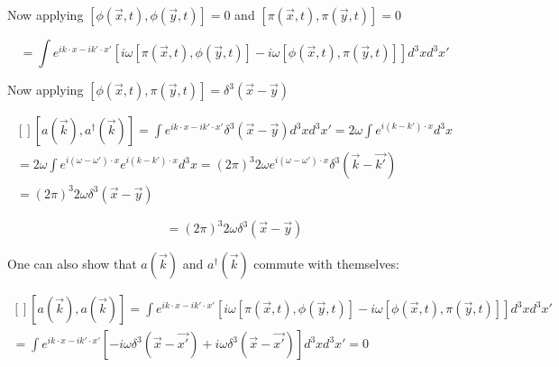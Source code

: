 \documentclass{article}
\begin{document}
    Now applying $[\phi(\vec{x}, t), \phi(\vec{y}, t)] = 0$ and $[\pi(\vec{x}, t), \pi(\vec{y}, t)] = 0$

    \begin{equation}
        [a(\vec{k}), a^{\dag}(\vec{k})] = \int e^{i k \cdot x - i k' \cdot x'} [i \omega [\pi(\vec{x}, t), \phi(\vec{y}, t)] - i \omega [\phi(\vec{x}, t), \pi(\vec{y}, t)]] d^{3} x d^{3} x'
    \end{equation}

    Now applying $[\phi(\vec{x}, t), \pi(\vec{y}, t)] = \delta^{3} (\vec{x} - \vec{y})$

    \begin{equation}
        \begin{aligned}[]
            [a(\vec{k}), a^{\dag}(\vec{k})] = \int e^{i k \cdot x - i k' \cdot x'} \delta^{3} (\vec{x} - \vec{y}) d^{3} x d^{3} x' = 2 \omega \int e^{i (k - k') \cdot x} d^{3} x \\
            = 2 \omega \int e^{i (\omega - \omega') \cdot x} e^{i (k - k') \cdot x} d^{3} x = (2 \pi)^{3} 2 \omega e^{i (\omega - \omega') \cdot x} \delta^{3} (\vec{k} - \vec{k'}) \\
            = (2 \pi)^{3} 2 \omega \delta^{3} (\vec{x} - \vec{y})
        \end{aligned}
    \end{equation}

    \begin{framed}
        \begin{equation}
            [a(\vec{k}), a^{\dag}(\vec{k})] = (2 \pi)^{3} 2 \omega \delta^{3} (\vec{x} - \vec{y})
        \end{equation}
    \end{framed}

    One can also show that $a(\vec{k})$ and $a^{\dag}(\vec{k})$ commute with themselves:

    \begin{equation}
        \begin{aligned}[]
            [a(\vec{k}), a(\vec{k})] = \int e^{i k \cdot x - i k' \cdot x'} [i \omega [\pi(\vec{x}, t), \phi(\vec{y}, t)] - i \omega [\phi(\vec{x}, t), \pi(\vec{y}, t)]] d^{3} x d^{3} x' \\
            = \int e^{i k \cdot x - i k' \cdot x'} [- i \omega \delta^{3} (\vec{x} - \vec{x'}) + i \omega \delta^{3} (\vec{x} - \vec{x'})] d^{3} x d^{3} x' = 0
        \end{aligned}
    \end{equation}
\end{document}
